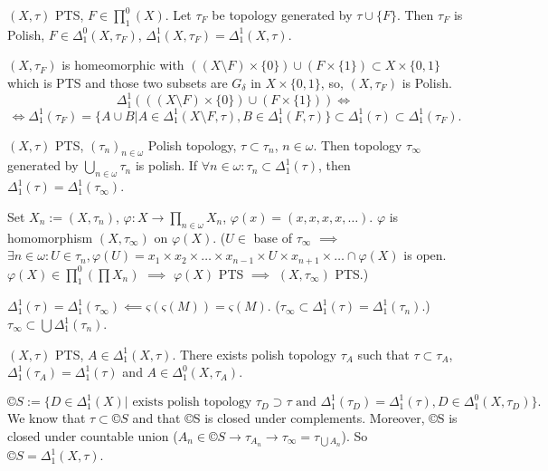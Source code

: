 \documentclass[12pt]{article}					%
\begin{document}
\begin{lemma}
	$(X, τ)$ PTS, $F \in ∏_1^0(X)$. Let $τ_F$ be topology generated by $τ \cup \{F\}$. Then $τ_F$ is Polish, $F \in Δ_1^0(X, τ_F)$, $Δ_1^1(X, τ_F) = Δ_1^1(X, τ)$.

	\begin{dukazin}
		$(X, τ_F)$ is homeomorphic with $((X \setminus F) \times \{0\}) \cup (F \times \{1\}) \subset X \times \{0, 1\}$ which is PTS and those two subsets are $G_δ$ in $X \times \{0, 1\}$, so, $(X, τ_F)$ is Polish.
		$$ Δ_1^1(((X \setminus F) \times \{0\}) \cup (F \times \{1\})) \Leftrightarrow $$
		$$ \Leftrightarrow Δ_1^1(τ_F) = \{A \cup B | A \in Δ_1^1(X \setminus F, τ), B \in Δ_1^1(F, τ)\} \subset Δ_1^1(τ) \subset Δ_1^1(τ_F). $$
	\end{dukazin}
\end{lemma}

\begin{lemma}
	$(X, τ)$ PTS, $(τ_n)_{n \in ω}$ Polish topology, $τ \subset τ_n$, $n \in ω$. Then topology $τ_∞$ generated by $\bigcup_{n \in ω} τ_n$ is polish. If $\forall n \in ω: τ_n \subset Δ_1^1(τ)$, then $Δ_1^1(τ) = Δ_1^1(τ_∞)$.

	\begin{dukazin}
		Set $X_n := (X, τ_n)$, $φ: X \rightarrow \prod_{n \in ω} X_n$, $φ(x) = (x, x, x, x, …)$. $φ$ is homomorphism $(X, τ_∞)$ on $φ(X)$. ($U \in$ base of $τ_∞$ $\implies$ $\exists n \in ω: U \in τ_n, φ(U) = x_1 \times x_2 \times … \times x_{n-1} \times U \times x_{n+1} \times … \cap φ(X)$ is open. $φ(X) \in ∏_1^0(\prod X_n)$ $\implies$ $φ(X)$ PTS $\implies$ $(X, τ_∞)$ PTS.)

		$Δ_1^1(τ) = Δ_1^1(τ_∞) \impliedby ς(ς(M)) = ς(M)$. ($τ_∞ \subset Δ_1^1(τ) = Δ_1^1(τ_n)$.) $τ_∞ \subset \bigcup Δ_1^1(τ_n)$.
	\end{dukazin}
\end{lemma}

\begin{veta}
	$(X, τ)$ PTS, $A \in Δ_1^1(X, τ)$. There exists polish topology $τ_A$ such that $τ \subset τ_A$, $Δ_1^1(τ_A) = Δ_1^1(τ)$ and $A \in Δ_1^0(X, τ_A)$.

	\begin{dukazin}
		$$ ©S := \{D \in Δ_1^1(X) | \text{ exists polish topology $τ_D \supset τ$ and $Δ_1^1(τ_D) = Δ_1^1(τ)$}, D \in Δ_1^0(X, τ_D)\}. $$
		We know that $τ \subset ©S$ and that ©S is closed under complements. Moreover, ©S is closed under countable union ($A_n \in ©S \rightarrow τ_{A_n} \rightarrow τ_∞ = τ_{\bigcup A_n}$). So $©S = Δ_1^1(X, τ)$.
	\end{dukazin}
\end{veta}
\end{document}
